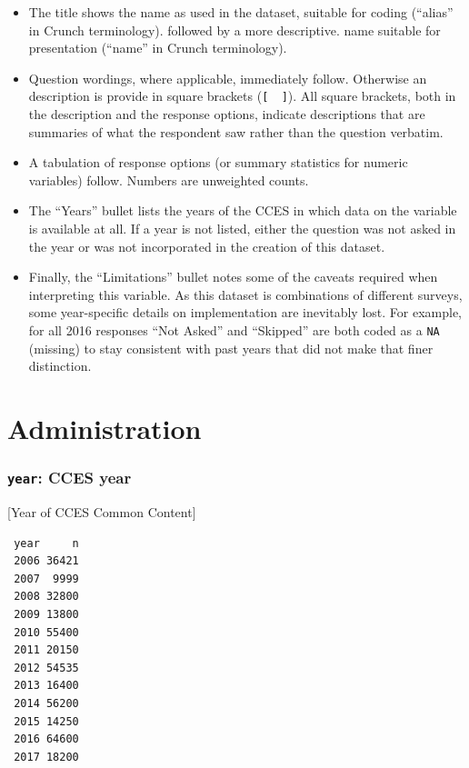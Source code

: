 \documentclass[10pt,article,oneside]{memoir}
\theoremstyle{definition}
\begin{document}
\begin{itemize}
\tightlist
\item
  The title shows the name as used in the dataset, suitable for coding
  (``alias'' in Crunch terminology). followed by a more descriptive.
  name suitable for presentation (``name'' in Crunch terminology).
\item
  Question wordings, where applicable, immediately follow. Otherwise an
  description is provide in square brackets (\texttt{{[}\ \ {]}}). All
  square brackets, both in the description and the response options,
  indicate descriptions that are summaries of what the respondent saw
  rather than the question verbatim.
\item
  A tabulation of response options (or summary statistics for numeric
  variables) follow. Numbers are unweighted counts.
\item
  The ``Years'' bullet lists the years of the CCES in which data on the
  variable is available at all. If a year is not listed, either the
  question was not asked in the year or was not incorporated in the
  creation of this dataset.
\item
  Finally, the ``Limitations'' bullet notes some of the caveats required
  when interpreting this variable. As this dataset is combinations of
  different surveys, some year-specific details on implementation are
  inevitably lost. For example, for all 2016 responses ``Not Asked'' and
  ``Skipped'' are both coded as a \texttt{NA} (missing) to stay
  consistent with past years that did not make that finer distinction.
\end{itemize}

\hypertarget{administration}{%
\section{Administration}\label{administration}}

\hypertarget{year-cces-year}{%
\subsubsection{\texorpdfstring{\texttt{year}: CCES
year}{year: CCES year}}\label{year-cces-year}}

{[}Year of CCES Common Content{]}

\begin{verbatim}
 year     n
 2006 36421
 2007  9999
 2008 32800
 2009 13800
 2010 55400
 2011 20150
 2012 54535
 2013 16400
 2014 56200
 2015 14250
 2016 64600
 2017 18200
\end{verbatim}
\end{document}
